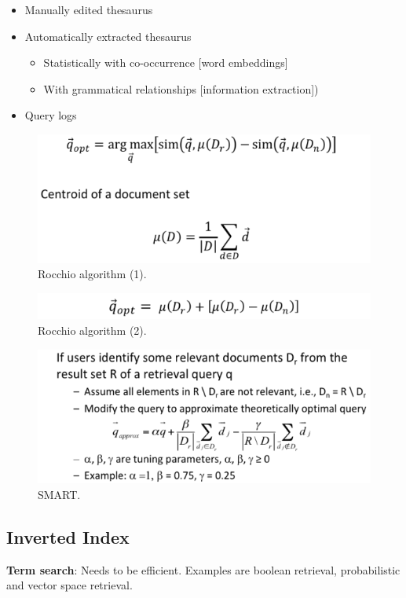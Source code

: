 \begin{itemize}
\begin{itemize}
\begin{itemize}
          \item Manually edited thesaurus
          \item Automatically extracted thesaurus
          \begin{itemize}
            \item Statistically with co-occurrence [word embeddings]
            \item With grammatical relationships [information extraction])
          \end{itemize}
          \item Query logs
        \end{itemize}
      \end{itemize}
    \end{itemize}

    \begin{figure}[htp]
      \centering
        \includegraphics[width=.65\textwidth]{images/rocchio.png}
        \caption{Rocchio algorithm (1).}
        \label{fig:rocchio}
    \end{figure}
    \begin{figure}[htp]
      \centering
        \includegraphics[width=.65\textwidth]{images/rocchio2.png}
        \caption{Rocchio algorithm (2).}
        \label{fig:rocchio2}
    \end{figure}
    \begin{figure}[htp]
      \centering
        \includegraphics[width=.65\textwidth]{images/smart.png}
        \caption{SMART.}
        \label{fig:smart}
    \end{figure}

  \subsection{Inverted Index} %
  \label{sub:inverted_index}
    \textbf{Term search}: Needs to be efficient. Examples are boolean retrieval, probabilistic and vector space retrieval.

